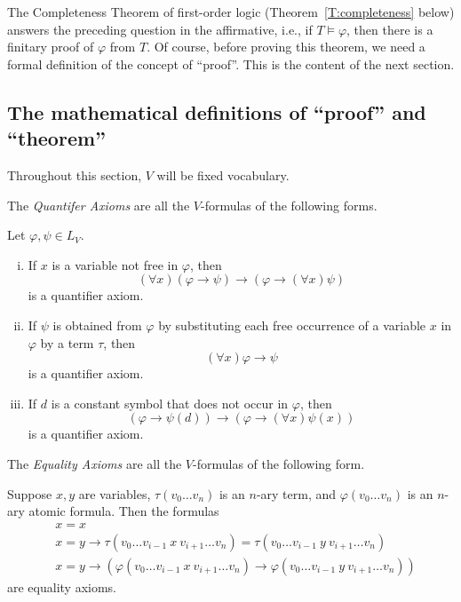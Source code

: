 \documentclass{scrartcl}
\renewcommand{\phi}{\varphi}
\begin{document}
The Completeness Theorem of first-order logic (Theorem~\ref{T:completeness} below) answers the preceding question in the affirmative, i.e., if \label{T:completeness} $T\models\phi$, then there is a finitary proof of $\phi$ from $T$.  Of course, before proving this theorem, we need a formal definition of the concept of ``proof''. This is the content of the next section.

\subsection{The mathematical definitions of ``proof'' and ``theorem''}
\label{S:Proof}

Throughout this section, $V$ will be fixed vocabulary.

\begin{definition}
\label{D:quantifier axioms}
The \emph{Quantifer Axioms} are all the $V$-formulas of the following forms.

Let $\phi,\psi\in L_V$.
\begin{enumerate}[i)]
\item If $x$ is a variable not free in $\phi$, then
\[
(\forall x)(\phi\rightarrow \psi)\rightarrow(\phi\rightarrow(\forall x)\psi)
\]
is a quantifier axiom.
\item If $\psi$ is obtained from $\phi$ by substituting each free occurrence of a variable $x$ in $\phi$ by a term $\tau$, then
\[
(\forall x)\phi\rightarrow \psi
\]
is a quantifier axiom.
\item
 If $d$ is a constant symbol that does not occur in $\phi$, then 
 \[
(\phi\rightarrow\psi(d))\rightarrow(\phi\rightarrow(\forall x)\psi(x))
\]
is a quantifier axiom.
\end{enumerate}
\end{definition}

\begin{definition}
\label{D:equality axioms}
The \emph{Equality Axioms} are all the $V$-formulas of the following form.

Suppose $x,y$ are variables, $\tau(v_0\dots v_n)$ is an $n$-ary term, and $\phi(v_0\dots v_n)$ is an $n$-ary atomic formula. Then the formulas
\begin{align*}
&x=x\\
&x=y\rightarrow \tau(v_0\dots v_{i-1} \ x  \ v_{i+1}\dots v_n) = \tau(v_0\dots v_{i-1} \ y\ v_{i+1}\dots v_n)\\
&x=y\rightarrow (\phi(v_0\dots v_{i-1} \ x\ v_{i+1}\dots v_n) \rightarrow \phi(v_0\dots v_{i-1}\ y\ v_{i+1}\dots v_n))
\end{align*}
are equality axioms.
\end{definition}
\end{document}
